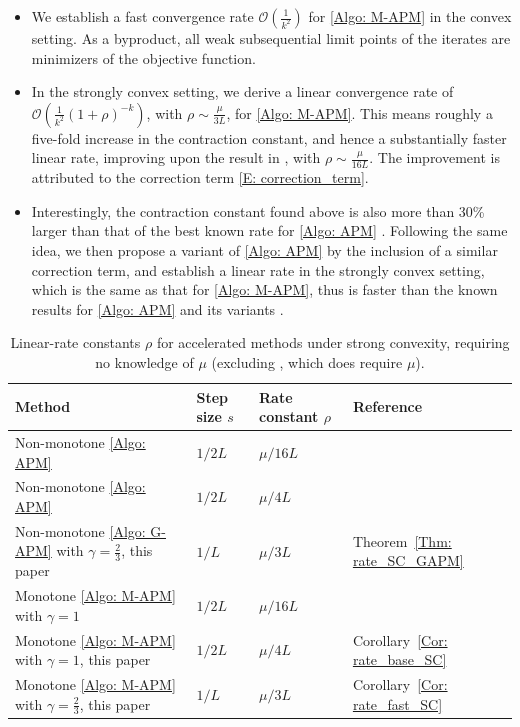 \documentclass[pdflatex,sn-mathphys-num]{sn-jnl}
\theoremstyle{thmstyleone}
\theoremstyle{thmstyletwo}
\theoremstyle{thmstylethree}
\begin{document}
\begin{itemize}
\item 
We establish a fast convergence rate $\mathcal{O}\left( \frac{1}{k^2} \right)$ for \eqref{Algo: M-APM} in the convex setting. As a byproduct, all weak subsequential limit points of the iterates are minimizers of the objective function.

\item
In the strongly convex setting, we derive a linear convergence rate of $\mathcal{O}\left( \frac{1}{k^2}(1+\rho)^{-k} \right)$, with $\rho\sim \frac{\mu}{3L}$, for \eqref{Algo: M-APM}. This means roughly a five-fold increase in the contraction constant, and hence a substantially faster linear rate, improving upon the result in \cite{Shi_2024_Monotone}, with $\rho\sim\frac{\mu}{16L}$. The improvement is attributed to the correction term \eqref{E: correction_term}.

\item Interestingly, the contraction constant found above is also more than 30\% larger than that of the best known rate for \eqref{Algo: APM} \cite{Bao_2023}. Following the same idea, we then propose a variant of \eqref{Algo: APM} by the inclusion of a similar correction term, and establish a linear rate in the strongly convex setting, which is the same as that for \eqref{Algo: M-APM}, thus is faster than the known results for \eqref{Algo: APM} and its variants \cite{Shi_2024,Shi_2024_Monotone,Bao_2023}.
\end{itemize}
 

\begin{table}[ht]
\centering
\caption{Linear-rate constants $\rho$ for accelerated methods under strong convexity, requiring no knowledge of $\mu$ (excluding \cite{Nesterov_2004}, which does require $\mu$).}
\label{Tab: comparison}
\begin{tabular}{@{}llll@{}}
\toprule
Method & Step size $s$ & Rate constant $\rho$ & Reference \\
\midrule
Non-monotone \eqref{Algo: APM} & $1/2L$ & $\mu/16L$ & \cite{Shi_2024,Shi_2024_Monotone} \\
Non-monotone \eqref{Algo: APM} & $1/2L$ & $\mu/4L$ & \cite{Bao_2023} \\
Non-monotone \eqref{Algo: G-APM} with $\gamma=\frac{2}{3}$, this paper & $1/L$ & $\mu/3L$ & Theorem~\ref{Thm: rate_SC_GAPM} \\ 
Monotone \eqref{Algo: M-APM} with $\gamma=1$ & $1/2L$ & $\mu/16L$ & \cite{Shi_2024_Monotone} \\
Monotone \eqref{Algo: M-APM} with $\gamma=1$, this paper & $1/2L$ & $\mu/4L$ & Corollary~\ref{Cor: rate_base_SC} \\
Monotone \eqref{Algo: M-APM} with $\gamma=\frac{2}{3}$, this paper & $1/L$ & $\mu/3L$ & Corollary~\ref{Cor: rate_fast_SC} \\
\bottomrule
\end{tabular}
\end{table}
\end{document}
